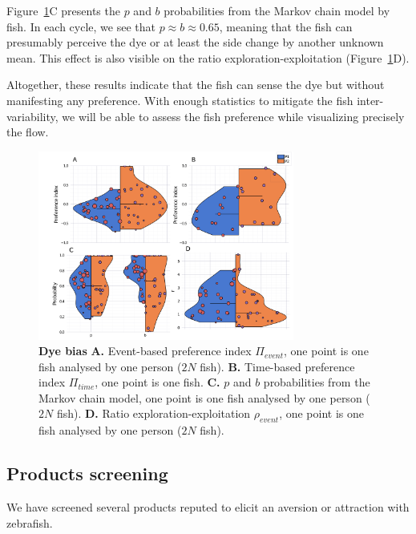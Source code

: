   Figure~\ref{dye_bias}C presents the $p$ and $b$ probabilities from the Markov chain model by fish. In each cycle, we see that $p \approx b \approx 0.65$, meaning that the fish can presumably perceive the dye or at least the side change by another unknown mean. This effect is also visible on the ratio exploration-exploitation (Figure~\ref{dye_bias}D).

  Altogether, these results indicate that the fish can sense the dye but without manifesting any preference. With enough statistics to mitigate the fish inter-variability, we will be able to assess the fish preference while visualizing precisely the flow.

    \begin{figure}[H]
      \centering
      \includegraphics[width=0.75\textwidth]{part_2/assets/dye_pi.png}
      \caption{\textbf{Dye bias} \textbf{A.} Event-based preference index $\Pi_{event}$, one point is one fish analysed by one person ($2N$ fish). \textbf{B.} Time-based preference index $\Pi_{time}$, one point is one fish. \textbf{C.} $p$ and $b$ probabilities from the Markov chain model, one point is one fish analysed by one person ($2N$ fish). \textbf{D.} Ratio exploration-exploitation $\rho_{event}$, one point is one fish analysed by one person ($2N$ fish).}
      \label{dye_bias}
    \end{figure}

  \subsection{Products screening}
  We have screened several products reputed to elicit an aversion or attraction with zebrafish.

